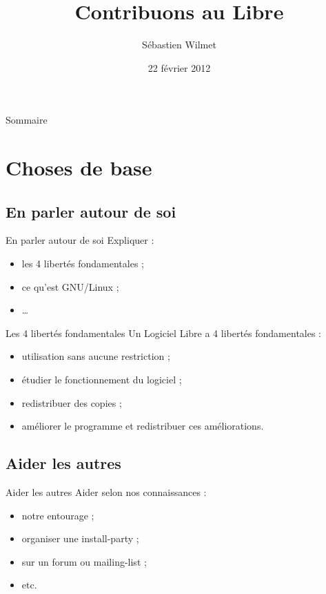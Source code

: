 \documentclass{beamer}
\title{Contribuons au Libre}
\author{Sébastien Wilmet}
\date{22 février 2012}
\institute{LouviLUG}
\begin{document}
\begin{frame}
  \titlepage
\end{frame}

\begin{frame}{Sommaire}
  \tableofcontents[hideallsubsections]
\end{frame}

\section{Choses de base}
\begin{frame}
  \tableofcontents[sectionstyle=show/shaded, hideothersubsections]
\end{frame}

\subsection{En parler autour de soi}
\begin{frame}{En parler autour de soi}
  Expliquer :
  \begin{itemize}
    \item les 4 libertés fondamentales ;
    \item ce qu'est GNU/Linux ;
    \item …
  \end{itemize}
\end{frame}

\begin{frame}{Les 4 libertés fondamentales}
  Un Logiciel Libre a 4 libertés fondamentales :
  \begin{itemize}
    \item utilisation sans aucune restriction ;
    \item étudier le fonctionnement du logiciel ;
    \item redistribuer des copies ;
    \item améliorer le programme et redistribuer ces améliorations.
  \end{itemize}
\end{frame}

\subsection{Aider les autres}
\begin{frame}{Aider les autres}
  Aider selon nos connaissances :
  \begin{itemize}
    \item notre entourage ;
    \item organiser une install-party ;
    \item sur un forum ou mailing-list ;
    \item etc.
  \end{itemize}
\end{frame}
\end{document}
